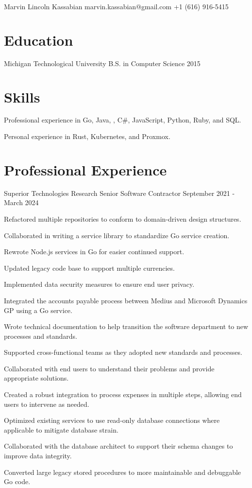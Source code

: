 \documentclass{marvinkassabian_resume}
\begin{document}
\resumeheadersimple
{Marvin Lincoln Kassabian}
{marvin.kassabian@gmail.com}
{+1 (616) 916-5415}

\section{Education}
\subsectionlocationdate
{Michigan Technological University}
{B.S. in Computer Science}
{2015}

\section{Skills}
\resumesublistbegin
\item Professional experience in Go, Java, \cpp, C\#, JavaScript, Python, Ruby, and SQL.
\item Personal experience in Rust, Kubernetes, and Proxmox.
\resumesublistend

\section{Professional Experience}

\subsectionpositiondate
{Superior Technologies Research}
{Senior Software Contractor}
{September 2021 - March 2024}
\resumesublistbegin
\item Refactored multiple repositories to conform to domain-driven design structures.
\item Collaborated in writing a service library to standardize Go service creation.
\item Rewrote Node.js services in Go for easier continued support.
\item Updated legacy code base to support multiple currencies.
\item Implemented data security measures to ensure end user privacy.
\item Integrated the accounts payable process between Medius and Microsoft Dynamics GP using a Go service.
\item Wrote technical documentation to help transition the software department to new processes and standards.
\item Supported cross-functional teams as they adopted new standards and processes.
\item Collaborated with end users to understand their problems and provide appropriate solutions.
\item Created a robust integration to process expenses in multiple steps, allowing end users to intervene as needed.
\item Optimized existing services to use read-only database connections where applicable to mitigate database strain.
\item Collaborated with the database architect to support their schema changes to improve data integrity.
\item Converted large legacy stored procedures to more maintainable and debuggable Go code.
\resumesublistend
\end{document}
